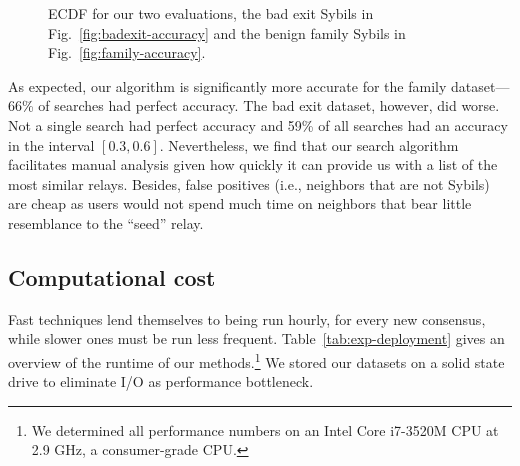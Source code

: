 \begin{figure}
\centering
{}
\caption{ECDF for our two evaluations, the bad exit Sybils
	in Fig.~\ref{fig:badexit-accuracy} and the benign family Sybils
	in Fig.~\ref{fig:family-accuracy}.}
\label{fig:accuracy}
\end{figure}

As expected, our algorithm is significantly more accurate for the family
dataset---66\% of searches had perfect accuracy.  The bad exit dataset, however,
did worse.  Not a single search had perfect accuracy and 59\% of all searches
had an accuracy in the interval $[0.3,0.6]$.  Nevertheless, we find that our
search algorithm facilitates manual analysis given how quickly it can provide us
with a list of the most similar relays.  Besides, false positives (i.e.,
neighbors that are not Sybils) are cheap as \sys users would not spend much time
on neighbors that bear little resemblance to the ``seed'' relay.

\subsection{Computational cost}
\label{sec:performance}
Fast techniques lend themselves to being run hourly, for every new consensus,
while slower ones must be run less frequent.  Table~\ref{tab:exp-deployment}
gives an overview of the runtime of our methods.\footnote{We determined all
performance numbers on an Intel Core i7-3520M CPU at 2.9 GHz, a consumer-grade
CPU.}  We stored our datasets on a solid state drive to eliminate I/O as
performance bottleneck.

